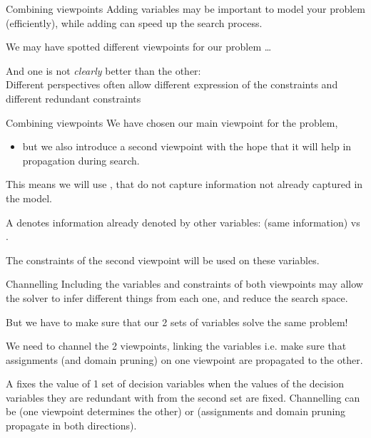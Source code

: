 \documentclass{cons-beamer}
\begin{document}
\begin{frame}{Combining viewpoints}
Adding  variables may be important to model your
problem (efficiently), while adding 
can speed up the search process.
\vfill

\vfill

We may have spotted different viewpoints for our problem \dots
\vfill

And one is not \textit{clearly}  better than the other: \\
Different perspectives often allow different expression of the
constraints and different redundant constraints
\vfill

\end{frame}

\begin{frame}{Combining viewpoints}
We have chosen our main viewpoint for the problem,\\
\begin{itemize}
  \item but we also introduce a second viewpoint with the hope that
    it will help in propagation during search.
\end{itemize}
\vfill

This means we will use , that do not
capture information not already captured in the model.
\begin{definition}
  A  denotes information
  already denoted by other
  variables:  (same information) vs
  .
\end{definition}\vfill

The constraints of the second viewpoint will be used on these variables.
\end{frame}

\begin{frame}{Channelling}
Including the variables and constraints of both viewpoints may
allow the solver to infer different things from each one, and
reduce the search space.
\vfill

But we have to make sure that our 2 sets of variables solve the
same problem!
\vfill

\alert{We need to channel the 2 viewpoints}, linking the variables
i.e. make sure that assignments (and domain pruning) on one
viewpoint are propagated to the other.
\vfill

\begin{definition}
  A  fixes the value of 1 set of decision variables when the values of the decision variables they are redundant with from the second set are fixed.
  Channelling can be  (one viewpoint determines the other) or  (assignments and domain pruning propagate in both directions).
\end{definition}
\end{frame}
\end{document}
